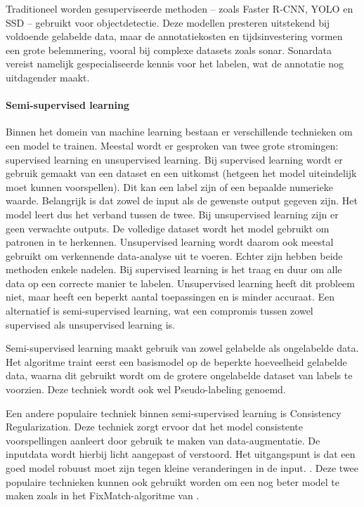 Traditioneel worden gesuperviseerde methoden -- zoals Faster R-CNN, YOLO en SSD -- gebruikt voor objectdetectie. \autocite{Redmon_2016} Deze modellen presteren uitstekend bij voldoende gelabelde data, maar de annotatiekosten en tijdsinvestering vormen een grote belemmering, vooral bij complexe datasets zoals sonar. Sonardata vereist namelijk gespecialiseerde kennis voor het labelen, wat de annotatie nog uitdagender maakt. \autocite{Long_2015}

\paragraph{Semi-supervised learning}

Binnen het domein van machine learning bestaan er verschillende technieken om een model te trainen. Meestal wordt er gesproken van twee grote stromingen: supervised learning en unsupervised learning. Bij supervised learning wordt er gebruik gemaakt van een dataset en een uitkomst (hetgeen het model uiteindelijk moet kunnen voorspellen). Dit kan een label zijn of een bepaalde numerieke waarde. Belangrijk is dat zowel de input als de gewenste output gegeven zijn. Het model leert dus het verband tussen de twee. Bij unsupervised learning zijn er geen verwachte outputs. De volledige dataset wordt het model gebruikt om patronen in te herkennen. Unsupervised learning wordt daarom ook meestal gebruikt om verkennende data-analyse uit te voeren. Echter zijn hebben beide methoden enkele nadelen. Bij supervised learning is het traag en duur om alle data op een correcte manier te labelen. Unsupervised learning heeft dit probleem niet, maar heeft een beperkt aantal toepassingen en is minder accuraat. Een alternatief is semi-supervised learning, wat een compromis tussen zowel supervised als unsupervised learning is. \autocite{C_A_Padmanabha_Reddy_2018}

Semi-supervised learning maakt gebruik van zowel gelabelde als ongelabelde data. Het algoritme traint eerst een basismodel op de beperkte hoeveelheid gelabelde data, waarna dit gebruikt wordt om de grotere ongelabelde dataset van labels te voorzien. Deze techniek wordt ook wel Pseudo-labeling genoemd. \autocite{Lee_2013}

Een andere populaire techniek binnen semi-supervised learning is Consistency Regularization. Deze techniek zorgt ervoor dat het model consistente voorspellingen aanleert door gebruik te maken van data-augmentatie. De inputdata wordt hierbij licht aangepast of verstoord. Het uitgangspunt is dat een goed model robuust moet zijn tegen kleine veranderingen in de input. \autocite{Fan_2022}.
Deze twee populaire technieken kunnen ook gebruikt worden om een nog beter model te maken zoals in het FixMatch-algoritme van \textcite{Sohn_2020}.


